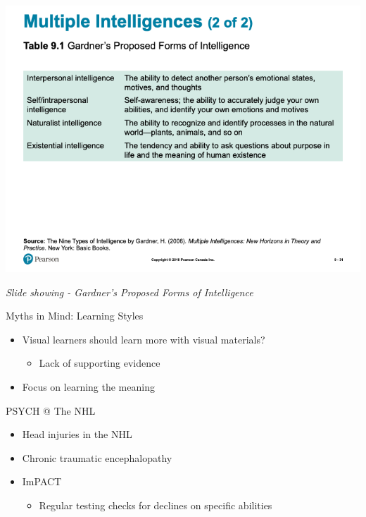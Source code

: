 \documentclass[
]{book}
\providecommand{\tightlist}{%
  \setlength{\itemsep}{0pt}\setlength{\parskip}{0pt}}
\begin{document}
\begin{reflect}
\includegraphics{assets/unit_2/slide_31.png}

\emph{Slide showing - Gardner's Proposed Forms of Intelligence}

Myths in Mind: Learning Styles

\begin{itemize}
\tightlist
\item
  Visual learners should learn more with visual materials?

  \begin{itemize}
  \tightlist
  \item
    Lack of supporting evidence\\
  \end{itemize}
\item
  Focus on learning the meaning
\end{itemize}

PSYCH @ The NHL

\begin{itemize}
\tightlist
\item
  Head injuries in the NHL\\
\item
  Chronic traumatic encephalopathy\\
\item
  ImPACT

  \begin{itemize}
  \tightlist
  \item
    Regular testing checks for declines on specific abilities
  \end{itemize}
\end{itemize}


\end{reflect}
\end{document}
